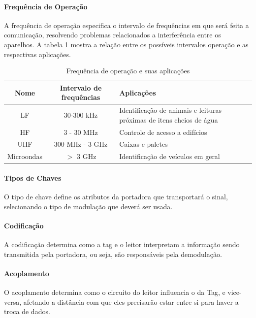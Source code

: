	\paragraph{Frequência de Operação} A frequência de operação especifica o intervalo de frequências em que será feita a comunicação, resolvendo problemas relacionados a interferência entre os aparelhos. A tabela \ref{tab:freqapp} mostra a relação entre os possíveis intervalos operação e as respectivas aplicações.

		\begin{table}
			\centering
			
			\begin{tabular}{|c|c|p{9cm}|}
				
				\hline Nome & Intervalo de frequências & Aplicações \\ 
				\hline LF & 30-300 kHz & Identificação de animais e leituras próximas de itens cheios de água \\ 
				\hline HF & 3 - 30 MHz & Controle de acesso a edifícios \\ 
				\hline UHF & 300 MHz - 3 GHz & Caixas e paletes \\ 
				\hline Microondas & $>$ 3 GHz & Identificação de veículos em geral \\ 
				\hline 
				
			\end{tabular} 	
			\caption{Frequência de operação e suas aplicações}
			\label{tab:freqapp}
		\end{table}	

	\paragraph{Tipos de Chaves} O tipo de chave define os atributos da portadora que transportará o sinal, selecionando o tipo de modulação que deverá ser usada.
	
	\paragraph{Codificação} A codificação determina como a tag e o leitor interpretam a informação sendo transmitida pela portadora, ou seja, são responsáveis pela demodulação.
  
	\paragraph{Acoplamento} O acoplamento determina como o circuito do leitor influencia o da Tag, e vice-versa, afetando a distância com que eles precisarão estar entre si para haver a troca de dados.\\
	 
